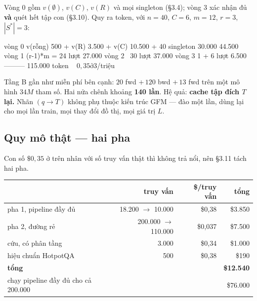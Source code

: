 \documentclass[11pt,a4paper]{article}
\begin{document}
Vòng 0 gồm $v(\emptyset)$, $v(C)$, $v(R)$ và mọi singleton (\S3.4); vòng 3 xác nhận đủ
\textbf{và} quét hết tập con (\S3.10). Quy ra token, với $n=40$, $C=6$, $m=12$, $r=3$,
$|S^*|=3$:

\begin{dia}
vòng 0    v(rỗng) 500 + v(R) 3.500 + v(C) 10.500 + 40 singleton 30.000   44.500
vòng 1    (r-1)*m = 24 lượt                                              27.000
vòng 2    ~30 lượt                                                       37.000
vòng 3    1 + 6 lượt                                                      6.500
                                                                      ---------
                                                                        115.000 token
                                                              ~ $0,35 ở $3/triệu
\end{dia}

Tầng B gần như miễn phí bên cạnh: $20$ fwd $+\,120$ bwd $+\,13$ fwd trên một mô hình $34M$
tham số. Hai nửa chênh khoảng \textbf{140 lần}. Hệ quả: \textbf{cache tập đích $T$ lại.} Nhãn
$(q\to T)$ không phụ thuộc kiến trúc GFM --- đào một lần, dùng lại cho mọi lần train, mọi
thay đổi đồ thị, mọi giá trị $L$.

\subsection{Quy mô thật --- hai pha}

Con số $\$0{,}35$ ở trên nhân với số truy vấn thật thì không trả nổi, nên \S3.11 tách hai pha.

\begin{center}
\begin{tabular}{@{}lrrr@{}}
\toprule
 & truy vấn & \$/truy vấn & tổng \\
\midrule
pha 1, pipeline đầy đủ & 18.200 $\to$ 10.000  & \$0,38  & \$3.850 \\
pha 2, đường rẻ        & 200.000 $\to$ 110.000 & \$0,037 & \$7.500 \\
cứu, có phân tầng      & 3.000   & \$0,34  & \$1.000 \\
hiệu chuẩn HotpotQA    & 500     & \$0,38  & \$190 \\
\midrule
\textbf{tổng} & & & \textbf{\$12.540} \\
chạy pipeline đầy đủ cho cả 200.000 & & & \$76.000 \\
\bottomrule
\end{tabular}
\end{center}
\end{document}
